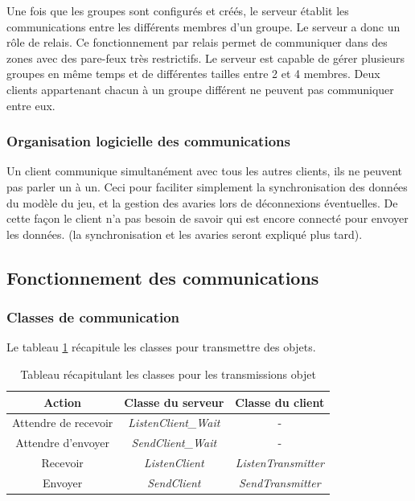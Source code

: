 \documentclass[a4paper, titlepage]{livret}
\begin{document}
  
  Une fois que les groupes sont configurés et créés, le serveur établit les communications entre les différents membres d’un groupe. Le serveur a donc un rôle de relais.
Ce fonctionnement par relais permet de communiquer dans des zones avec des pare-feux très restrictifs.
Le serveur est capable de gérer plusieurs groupes en même temps et de différentes tailles entre 2 et 4 membres. Deux clients appartenant chacun à un groupe différent ne peuvent pas communiquer entre eux.

\subsubsection{Organisation logicielle des communications}

  Un client communique simultanément avec tous les autres clients, ils ne peuvent pas parler un à un. 
Ceci pour faciliter simplement la synchronisation des données du modèle du jeu, et la gestion des avaries lors de déconnexions éventuelles. De cette façon le client n’a pas besoin de savoir qui est encore connecté pour envoyer les données. (la synchronisation et les avaries seront expliqué plus tard).
  
\subsection{Fonctionnement des communications}

\subsubsection{Classes de communication}
Le tableau \ref{tab1comClasses} récapitule les classes pour transmettre des objets.

  \begin{table}
    \begin{center}
      \begin{tabular}{|c|c|c|}
         \hline \textbf{Action}&\textbf{Classe du serveur}&\textbf{Classe du client} \\
         \hline Attendre de recevoir&\textit{ListenClient\_Wait}&- \\
         \hline Attendre d’envoyer&\textit{SendClient\_Wait}&- \\
         \hline Recevoir&\textit{ListenClient}&\textit{ListenTransmitter} \\
         \hline Envoyer&\textit{SendClient}&\textit{SendTransmitter}\\
         \hline
      \end{tabular}
      \caption{Tableau récapitulant les classes pour les transmissions objet}  
      \label{tab1comClasses}
    \end{center}
  \end{table}
  
\end{document}
